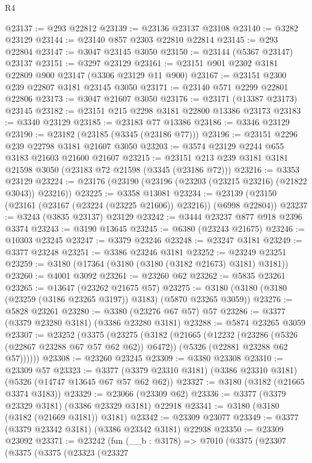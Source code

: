\begin{lexlean}{R4}
\begin{coremodule}
@23137 := @293 @22812
@23139 := @23136 @23137 @23108
@23140 := @3282 @23129
@23144 := @23140 @857 @2303 @22810 @22814
@23145 := @293 @22804
@23147 := @3047 @23145 @3050
@23150 := @23144 (@5367 @23147) @23137
@23151 := @3297 @23129
@23161 := @23151 @901 @2302 @3181 @22809 @900 @23147 (@3306 @23129 @11 @900)
@23167 := @23151 @2300 @239 @22807 @3181 @23145 @3050
@23171 := @23140 @571 @2299 @22801 @22806
@23173 := @3047 @21607 @3050
@23176 := @23171 (@13387 @23173) @23145
@23182 := @23151 @215 @2298 @3181 @22800 @13386 @23173
@23183 := @3340 @23129
@23185 := @23183 @77 @13386
@23186 := @3346 @23129
@23190 := @23182 (@23185 (@3345 (@23186 @77)))
@23196 := @23151 @2296 @239 @22798 @3181 @21607 @3050
@23203 := @3574 @23129 @2244 @655 @3183 @21603 @21600 @21607
@23215 := @23151 @213 @239 @3181 @3181 @21598 @3050 (@23183 @72 @21598 (@3345 (@23186 @72)))
@23216 := @3353 @23129
@23224 := @23176 (@23190 (@23196 (@23203 (@23215 @23216) (@21822 @3043)) @23216))
@23225 := @3358 @13081
@23234 := @23139 (@23150 (@23161 (@23167 (@23224 (@23225 @21606)) @23216)) (@6998 @22804))
@23237 := @3243 (@3835 @23137) @23129
@23242 := @3444 @23237 @877 @918 @2396 @3374
@23243 := @3190 @13645
@23245 := @6380 (@23243 @21675)
@23246 := @10303 @23245
@23247 := @3379 @23246
@23248 := @23247 @3181
@23249 := @3377 @23248
@23251 := @3386 @23246 @3181
@23252 := @23249 @23251
@23259 := @3180 (@17364 (@3180 (@3180 (@3182 @21673) @3181) @3181))
@23260 := @4001 @3092
@23261 := @23260 @62
@23262 := @5835 @23261
@23265 := @13647 (@23262 @21675 @57)
@23275 := @3180 (@3180 (@3180 (@23259 (@3186 @23265 @3197)) @3183) (@5870 @23265 @3059))
@23276 := @5828 @23261
@23280 := @3380 (@23276 @67 @57) @57
@23286 := @3377 (@3379 @23280 @3181) (@3386 @23280 @3181)
@23288 := @5874 @23265 @3059
@23307 := @23252
    (@3375
      (@23275
        (@3182
          (@21665
            (@12232 (@23286 (@5326 (@22867 @23288 @67 @57 @62 @62)) @6472))
            (@5326 (@22881 @23288 @62 @57))))))
@23308 := @23260 @23245
@23309 := @3380 @23308
@23310 := @23309 @57
@23323 := @3377 (@3379 @23310 @3181) (@3386 @23310 @3181) (@5326 (@14747 @13645 @67 @57 @62 @62))
@23327 := @3180 (@3182 (@21665 @3374 @3183))
@23329 := @23066 (@23309 @62)
@23336 := @3377 (@3379 @23329 @3181) (@3386 @23329 @3181) @22918
@23341 := @3180 (@3180 (@3182 (@21669 @3181)) @3181)
@23342 := @23309 @23077
@23349 := @3377 (@3379 @23342 @3181) (@3386 @23342 @3181) @22938
@23350 := @23309 @23092
@23371 := @23242
    (fun (__b : @3178) =>
    @7010
      (@3375
        (@23307
          (@3375
            (@3375
              (@23323
                (@23327

\end{coremodule}
\end{lexlean}
